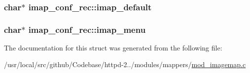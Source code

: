 \subsubsection[{\texorpdfstring{imap\+\_\+default}{imap_default}}]{\setlength{\rightskip}{0pt plus 5cm}char$\ast$ imap\+\_\+conf\+\_\+rec\+::imap\+\_\+default}\hypertarget{structimap__conf__rec_a36f60a144df71dd42f7b60b887ca6b4b}{}\label{structimap__conf__rec_a36f60a144df71dd42f7b60b887ca6b4b}
\subsubsection[{\texorpdfstring{imap\+\_\+menu}{imap_menu}}]{\setlength{\rightskip}{0pt plus 5cm}char$\ast$ imap\+\_\+conf\+\_\+rec\+::imap\+\_\+menu}\hypertarget{structimap__conf__rec_a2bb09b50b1db10c5ad7bceacf52b686c}{}\label{structimap__conf__rec_a2bb09b50b1db10c5ad7bceacf52b686c}


The documentation for this struct was generated from the following file\+:\begin{DoxyCompactItemize}
\item 
/usr/local/src/github/\+Codebase/httpd-\/2../modules/mappers/\hyperlink{mod__imagemap_8c}{mod\+\_\+imagemap.\+c}\end{DoxyCompactItemize}
